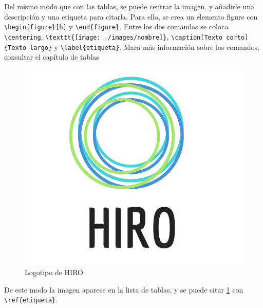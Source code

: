 Del mismo modo que con las tablas, se puede centrar la imagen, y añadirle una descripción y una etiqueta para citarla. Para ello, se crea un elemento figure con \verb!\begin{figure}[h]! y \verb!\end{figure}!. Entre los dos comandos se coloca \verb!\centering!, \verb!\texttt{[image: ./images/nombre]}!, \verb!\caption[Texto corto]{Texto largo}! y \verb!\label{etiqueta}!. Mara más información sobre los comandos, consultar el capítulo de tablas

\begin{figure}[H]
	\centering
	\includegraphics[scale=0.25]{./images/HIRO}
	\caption[HIRO logo]{Logotipo de HIRO}
	\label{hiro_logo}
\end{figure}

De este modo la imagen aparece en la lista de tablas, y se puede citar \ref{hiro_logo} con \verb!\ref{etiqueta}!.